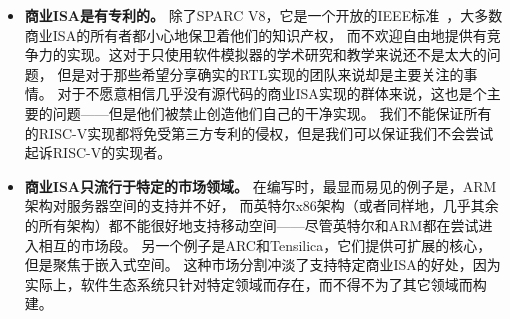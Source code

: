 \begin{itemize}
\item {\bf 商业ISA是有专利的。} 除了SPARC V8，它是一个开放的IEEE标准~\cite{sparcieee1994}，大多数商业ISA的所有者都小心地保卫着他们的知识产权，
而不欢迎自由地提供有竞争力的实现。这对于只使用软件模拟器的学术研究和教学来说还不是太大的问题，
但是对于那些希望分享确实的RTL实现的团队来说却是主要关注的事情。
对于不愿意相信几乎没有源代码的商业ISA实现的群体来说，这也是个主要的问题——但是他们被禁止创造他们自己的干净实现。
我们不能保证所有的RISC-V实现都将免受第三方专利的侵权，但是我们可以保证我们不会尝试起诉RISC-V的实现者。

\item {\bf 商业ISA只流行于特定的市场领域。} 在编写时，最显而易见的例子是，ARM架构对服务器空间的支持并不好，
而英特尔x86架构（或者同样地，几乎其余的所有架构）都不能很好地支持移动空间——尽管英特尔和ARM都在尝试进入相互的市场段。
另一个例子是ARC和Tensilica，它们提供可扩展的核心，但是聚焦于嵌入式空间。
这种市场分割冲淡了支持特定商业ISA的好处，因为实际上，软件生态系统只针对特定领域而存在，而不得不为了其它领域而构建。


\end{itemize}

